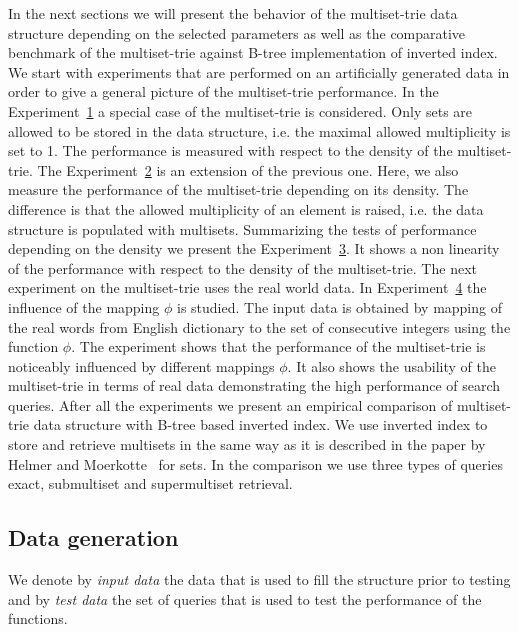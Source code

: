 In the next sections we will present the behavior of the multiset-trie data 
structure depending on the selected parameters as well as the comparative 
benchmark of the multiset-trie against B-tree implementation of inverted index. 
We start with experiments that are performed on an artificially generated data in 
order to give a general picture of the multiset-trie performance. In the 
Experiment~\hyperref[s:exp1]{1} a special case of the multiset-trie is considered. 
Only sets are allowed to be stored in the data structure, i.e. the maximal allowed 
multiplicity is set to 1. The performance is measured with respect to the density 
of the multiset-trie.
%
The Experiment~\hyperref[s:exp2]{2} is an extension of the previous one. Here, 
we also measure the performance of the multiset-trie depending on its density. 
The difference is that the allowed multiplicity of an element is raised, i.e. 
the data structure is populated with multisets. 
%
Summarizing the tests of performance depending on the density we present the 
Experiment~\hyperref[s:exp3]{3}. It shows a non linearity of the performance 
with respect to the density of the multiset-trie.
%
The next experiment on the multiset-trie uses the real world data. In 
Experiment~\hyperref[s:exp4]{4} the influence of the mapping $\phi$ is studied. 
The input data is obtained by mapping of the real words from English dictionary 
to the set of consecutive integers using the function $\phi.$ The experiment 
shows that the performance of the multiset-trie is noticeably influenced by 
different mappings $\phi.$ It also shows the usability of the multiset-trie in terms 
of real data demonstrating the high performance of search queries.
%
After all the experiments we present an empirical comparison of multiset-trie 
data structure with B-tree based inverted index. We use inverted index 
to store and retrieve multisets in the same way as it is described in the paper by 
Helmer and Moerkotte~\cite{Helmer2003} for sets. In the comparison we use 
three types of queries exact, submultiset and supermultiset retrieval.

\subsection*{Data generation}
We denote by \emph{input data} the data that is used to fill the structure prior 
to testing and by \emph{test data} the set of queries that is used to test the 
performance of the functions.

